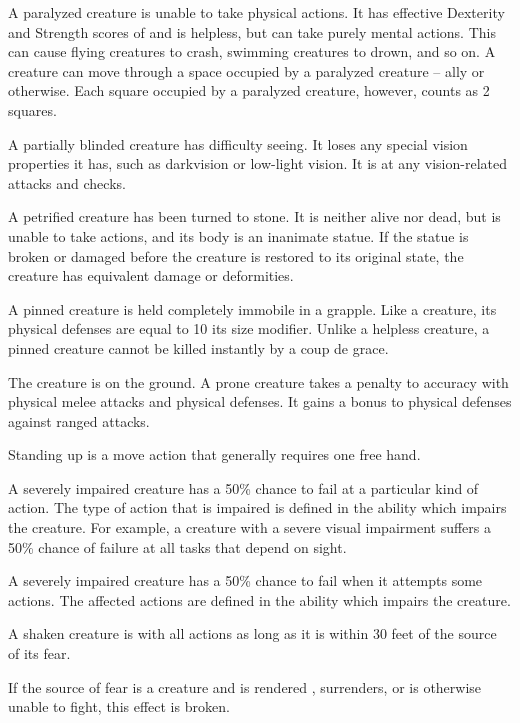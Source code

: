  A paralyzed creature is unable to take physical actions. It has effective Dexterity and Strength scores of  and is helpless, but can take purely mental actions. This can cause flying creatures to crash, swimming creatures to drown, and so on. A creature can move through a space occupied by a paralyzed creature -- ally or otherwise. Each square occupied by a paralyzed creature, however, counts as 2 squares.

 A partially blinded creature has difficulty seeing. It loses any special vision properties it has, such as darkvision or low-light vision. It is \impaired at any vision-related attacks and checks.

 A petrified creature has been turned to stone. It is neither alive nor dead, but is unable to take actions, and its body is an inanimate statue. If the statue is broken or damaged before the creature is restored to its original state, the creature has equivalent damage or deformities.

 A pinned creature is held completely immobile in a grapple. Like a  creature, its physical defenses are equal to 10 \add its size modifier. Unlike a helpless creature, a pinned creature cannot be killed instantly by a coup de grace.

 The creature is on the ground. A prone creature takes a  penalty to accuracy with physical melee attacks and physical defenses. It gains a  bonus to physical defenses against ranged attacks.

Standing up is a move action that generally requires one free hand.

 A severely impaired creature has a 50\% chance to fail at a particular kind of action. The type of action that is impaired is defined in the ability which impairs the creature. For example, a creature with a severe visual impairment suffers a 50\% chance of failure at all tasks that depend on sight.

 A severely impaired creature has a 50\% chance to fail when it attempts some actions. The affected actions are defined in the ability which impairs the creature.

 A shaken creature is \impaired with all actions as long as it is within 30 feet of the source of its fear.

If the source of fear is a creature and is rendered \helpless, surrenders, or is otherwise unable to fight, this effect is broken.


